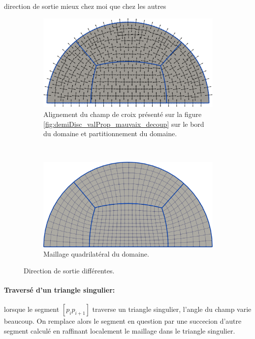 direction de sortie mieux chez moi que chez les autres

\begin{figure}[!h]
\centering
\begin{subfigure}{0.65\textwidth}
    \includegraphics[width=\textwidth]{images/demi_disc_second_phi_first.pdf}
    \caption{Alignement du champ de croix présenté sur la figure \ref{fig:demiDisc_valProp_mauvaix_decoup} sur le bord du domaine et partitionnement du domaine.}
    \label{fig:first_dir_first}
\end{subfigure}
\\[0.5cm]
\begin{subfigure}{0.65\textwidth}
    \includegraphics[width=\textwidth]{images/demi_disc_second_phi_second.pdf}
    \caption{Maillage quadrilatéral du domaine.}
    \label{fig:first_dir_second}
\end{subfigure}        
\caption{Direction de sortie différentes.}
\label{fig:first_dir}
\end{figure}


\paragraph{Traversé d'un triangle singulier:} lorsque le segment $[p_ip_{i+1}]$ traverse un triangle singulier, l'angle du champ varie beaucoup. On remplace alors le segment en question par une succecion d'autre segment calculé en raffinant localement le maillage dans le triangle singulier.

